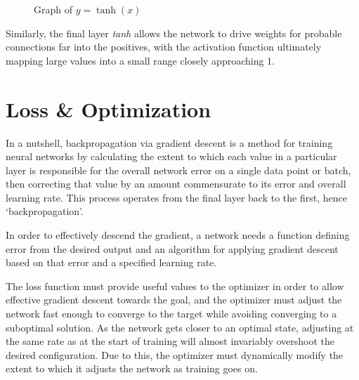 \begin{wrapfigure}[5]{r}{.45\textwidth}
	\centering
	\vspace{-14pt}
	\caption{Graph of $y=\tanh(x)$}
	\label{fig:tanh}
\end{wrapfigure}
Similarly, the final layer \textit{tanh} allows the network to drive weights for 
probable connections far into the positives, with the activation function 
ultimately mapping large values into a small range closely approaching 1.

\section{Loss \& Optimization}
\label{sec:lossandop}
In a nutshell, backpropagation via gradient descent is a method for training 
neural networks by calculating the extent to which each value in a particular 
layer is responsible for the overall network error on a single data point or 
batch, then correcting that value by an amount commensurate to its error and 
overall learning rate. This process operates from the final layer back to the 
first, hence `backpropagation'.\cite{Rumelhart}

In order to effectively descend the gradient, a network needs a function 
defining error from the desired output and an algorithm for applying gradient 
descent based on that error and a specified learning rate.

The loss function must provide useful values to the optimizer in order to allow 
effective gradient descent towards the goal, and the optimizer must adjust the 
network fast enough to converge to the target while avoiding converging to a 
suboptimal solution. As the network gets closer to an optimal state, adjusting 
at the same rate as at the start of training will almost invariably overshoot 
the desired configuration. Due to this, the optimizer must dynamically modify 
the extent to which it adjusts the network as training goes on.

